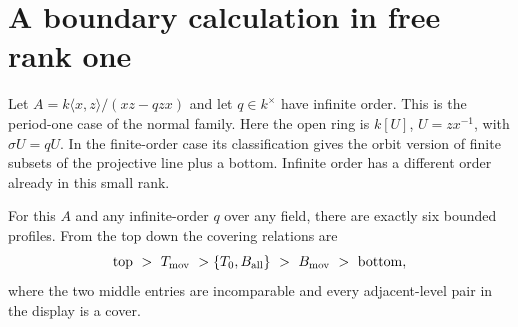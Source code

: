 \documentclass[11pt]{article}
\begin{document}
\section{A boundary calculation in free rank one}
Let $A=k\langle x,z\rangle/(xz-qzx)$ and let $q\in k^\times$ have
infinite order. This is the period-one case of the normal family.
Here the open ring is $k[U]$, $U=zx^{-1}$, with $\sigma U=qU$.
In the finite-order case its classification gives the orbit version of
finite subsets of the projective line plus a bottom. Infinite order
has a different order already in this small rank.

\begin{thm}\label{six}
For this $A$ and any infinite-order $q$ over any field, there are
exactly six bounded profiles. From the top down the covering relations
are
\[
 \mathrm{top}\ >\ T_{\rm mov}\ >
 \{T_0,B_{\rm all}\}\ >\ B_{\rm mov}\ >\ \mathrm{bottom},
\]
where the two middle entries are incomparable and every adjacent-level
pair in the display is a cover.
\end{thm}
\end{document}
